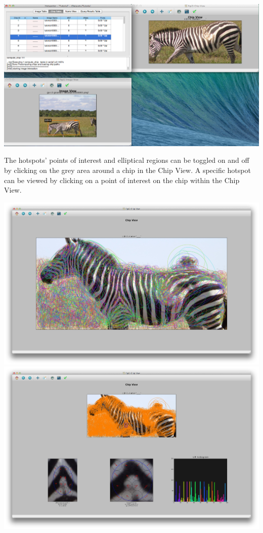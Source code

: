 \documentclass[a4paper,10pt]{article}
\begin{document}
        \begin{center}
          \includegraphics[scale=0.2]{images/chip.png}
        \end{center}

        The hotspots' points of interest and elliptical regions can be
        toggled on and off by clicking on the grey area around a chip in the Chip View.
	A specific hotspot can be viewed by clicking on a point of interest on the chip within the Chip View.
        \begin{center}
            \includegraphics[scale=0.1]{images/chip-ellipse.png}
            \includegraphics[scale=0.1]{images/chip-hotspot.png}
        \end{center}
\end{document}
